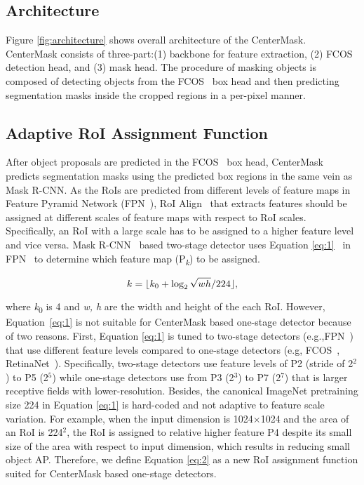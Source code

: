 \documentclass[10pt,twocolumn,letterpaper]{article}
\DeclarePairedDelimiter\floor{\lfloor}{\rfloor}
\begin{document}
\subsection{Architecture}
Figure \ref{fig:architecture} shows overall architecture of the  CenterMask. 
CenterMask consists of three-part:(1) backbone for feature extraction, (2) FCOS~\cite{Tian_2019_ICCV} detection head, and (3) mask head.
The procedure of masking objects is composed of detecting objects from the FCOS~\cite{Tian_2019_ICCV} box head and then predicting segmentation masks inside the cropped regions in a per-pixel manner.


\subsection{Adaptive RoI Assignment Function}\label{sec:3.2}
After object proposals are predicted in the FCOS~\cite{Tian_2019_ICCV} box head, CenterMask predicts segmentation masks using the predicted box regions in the same vein as Mask R-CNN.
As the RoIs are predicted from different levels of feature maps in Feature Pyramid Network (FPN~\cite{lin2017feature}), RoI Align~\cite{he2017mask} that extracts features should be assigned at different scales of feature maps with respect to RoI scales.
Specifically, an RoI with a large scale has to be assigned to a higher feature level and vice versa.
Mask R-CNN~\cite{he2017mask} based two-stage detector uses Equation \ref{eq:1}~ in FPN~\cite{lin2017feature} to determine which feature map (P\textsubscript{\textit{k}}) to be assigned.

\begin{equation} \label{eq:1}
k = \floor{k_0 + \log_2 \sqrt{wh}/224},
\end{equation}

\noindent
where \textit{k}\textsubscript{0} is 4 and \textit{w, h} are the width and height of the each RoI.
However, Equation~\ref{eq:1} is not suitable for CenterMask based one-stage detector because of two reasons.
First, Equation \ref{eq:1} is tuned to two-stage detectors (e.g.,FPN~\cite{lin2017feature}) that use different feature levels compared to one-stage detectors (e.g, FCOS~\cite{Tian_2019_ICCV}, RetinaNet~\cite{lin2018focal}).
Specifically, two-stage detectors use feature levels of P2 (stride of 2$^2$) to P5 (2$^5$) while one-stage detectors use from P3 (2$^3$) to P7 (2$^7$) that is larger receptive fields with lower-resolution.
Besides, the canonical ImageNet pretraining size 224 in Equation \ref{eq:1} is hard-coded and not adaptive to feature scale variation.
For example, when the input dimension is 1024$\times$1024 and the area of an RoI is 224$^2$, the RoI is assigned to relative higher feature P4 despite its small size of the area with respect to input dimension, which results in reducing small object AP.
Therefore, we define Equation \ref{eq:2} as a new RoI assignment function suited for CenterMask based one-stage detectors.
\end{document}

